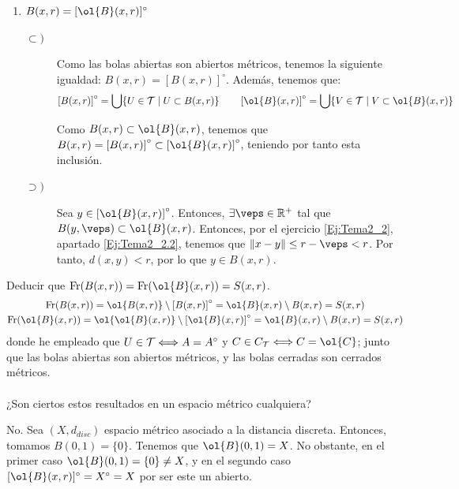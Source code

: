 \begin{ejercicio}
\begin{enumerate}
\begin{description}
            Por tanto, como ambos conjuntos son subconjuntos de $\ol{B(x,r)}$, se tiene de forma directa.
        \end{description}
        
        \item $B(x,r) = [\ol{B}(x,r)]^\circ$
        \begin{description}
            \item[$\subset)$] Como las bolas abiertas son abiertos métricos, tenemos la siguiente igualdad: $B(x,r)=\left[B(x,r)\right]^\circ$. Además, tenemos que:
            \begin{equation*}
                \left[B(x,r)\right]^\circ = \bigcup\{U\in \cc{T}\mid U\subset B(x,r)\}
                \qquad
                \left[\ol{B}(x,r)\right]^\circ = \bigcup\{V\in \cc{T}\mid V\subset \ol{B}(x,r)\}
            \end{equation*}

            Como $B(x,r)\subset \ol{B}(x,r)$, tenemos que $B(x,r)=\left[B(x,r)\right]^\circ\subset \left[\ol{B}(x,r)\right]^\circ$, teniendo por tanto esta inclusión.

            \item[$\supset)$] Sea $y\in \left[\ol{B}(x,r)\right]^\circ$. Entonces, $\exists \veps\in \bb{R}^+$ tal que $B(y,\veps)\subset \ol{B}(x,r)$. Entonces, por el ejercicio \ref{Ej:Tema2_2}, apartado \ref{Ej:Tema2_2.2}, tenemos que $\|x-y\|\leq r-\veps<r$. Por tanto, $d(x,y)<r$, por lo que $y\in B(x,r)$.
        \end{description}
    \end{enumerate}

    Deducir que $\Fr(B(x,r)) = \Fr(\ol{B}(x,r)) = S(x, r)$.
    \begin{gather*}
        \Fr(B(x,r)) = \ol{B(x,r)}\setminus \left[B(x,r)\right]^\circ = \ol{B}(x,r)\setminus B(x,r) = S(x,r) \\
        \Fr(\ol{B}(x,r)) = \ol{\ol{B}(x,r)}\setminus \left[\ol{B}(x,r)\right]^\circ = \ol{B}(x,r)\setminus B(x,r) = S(x,r)
    \end{gather*}
    donde he empleado que $U\in \mathcal{T}\Longleftrightarrow A=A^\circ$ y $C\in C_\cc{T}\Longleftrightarrow C=\ol{C}$; junto que las bolas abiertas son abiertos métricos, y las bolas cerradas son cerrados métricos.\\ \ \\
    
    ¿Son ciertos estos resultados en un espacio métrico cualquiera?

    No. Sea $(X,d_{disc})$ espacio métrico asociado a la distancia discreta. Entonces, tomamos $B(0,1)=\{0\}$. Tenemos que $\ol{B}(0,1)=X$. No obstante, en el primer caso $\ol{B}(0,1)=\{0\}\neq X$, y en el segundo caso $[\ol{B}(x,r)]^\circ = X^\circ = X$ por ser este un abierto.
\end{ejercicio}

